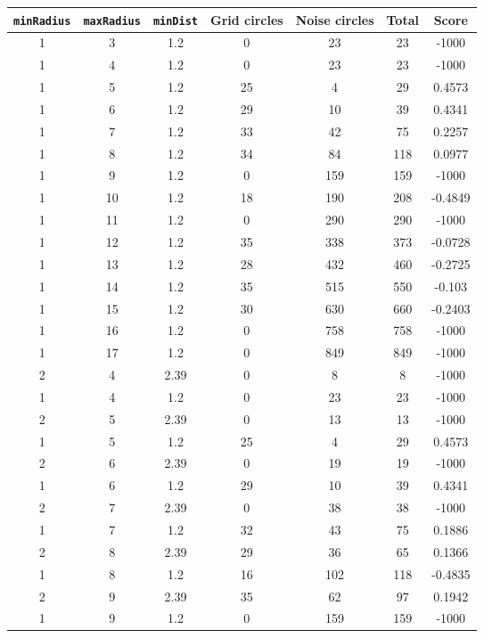 \documentclass[letterpaper, 12pt]{article}
\begin{document}
\begin{longtable}{|c|c|c|c|c|c|c|}
\hline
\textbf{\texttt{minRadius}} & \textbf{\texttt{maxRadius}} & \textbf{\texttt{minDist}} & \textbf{Grid circles} & \textbf{Noise circles} & \textbf{Total} & \textbf{Score} \\
\hline
1 & 3 & 1.2 & 0 & 23 & 23 & -1000 \\
\hline
1 & 4 & 1.2 & 0 & 23 & 23 & -1000 \\
\hline
1 & 5 & 1.2 & 25 & 4 & 29 & 0.4573 \\
\hline
1 & 6 & 1.2 & 29 & 10 & 39 & 0.4341 \\
\hline
1 & 7 & 1.2 & 33 & 42 & 75 & 0.2257 \\
\hline
1 & 8 & 1.2 & 34 & 84 & 118 & 0.0977 \\
\hline
1 & 9 & 1.2 & 0 & 159 & 159 & -1000 \\
\hline
1 & 10 & 1.2 & 18 & 190 & 208 & -0.4849 \\
\hline
1 & 11 & 1.2 & 0 & 290 & 290 & -1000 \\
\hline
1 & 12 & 1.2 & 35 & 338 & 373 & -0.0728 \\
\hline
1 & 13 & 1.2 & 28 & 432 & 460 & -0.2725 \\
\hline
1 & 14 & 1.2 & 35 & 515 & 550 & -0.103 \\
\hline
1 & 15 & 1.2 & 30 & 630 & 660 & -0.2403 \\
\hline
1 & 16 & 1.2 & 0 & 758 & 758 & -1000 \\
\hline
1 & 17 & 1.2 & 0 & 849 & 849 & -1000 \\
\hline
2 & 4 & 2.39 & 0 & 8 & 8 & -1000 \\
\hline
1 & 4 & 1.2 & 0 & 23 & 23 & -1000 \\
\hline
2 & 5 & 2.39 & 0 & 13 & 13 & -1000 \\
\hline
1 & 5 & 1.2 & 25 & 4 & 29 & 0.4573 \\
\hline
2 & 6 & 2.39 & 0 & 19 & 19 & -1000 \\
\hline
1 & 6 & 1.2 & 29 & 10 & 39 & 0.4341 \\
\hline
2 & 7 & 2.39 & 0 & 38 & 38 & -1000 \\
\hline
1 & 7 & 1.2 & 32 & 43 & 75 & 0.1886 \\
\hline
2 & 8 & 2.39 & 29 & 36 & 65 & 0.1366 \\
\hline
1 & 8 & 1.2 & 16 & 102 & 118 & -0.4835 \\
\hline
2 & 9 & 2.39 & 35 & 62 & 97 & 0.1942 \\
\hline
1 & 9 & 1.2 & 0 & 159 & 159 & -1000 \\

\end{longtable}
\end{document}
